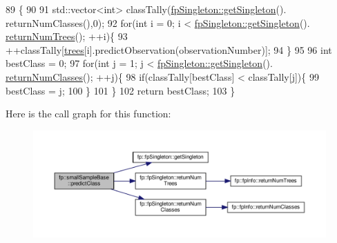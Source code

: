 \begin{DoxyCode}
89                                                    \{
90 
91                 std::vector<int> classTally(\hyperlink{classfp_1_1fpSingleton_a8bdae77b68521003e3fc630edec2e240}{fpSingleton::getSingleton}().
      returnNumClasses(),0);
92                 \textcolor{keywordflow}{for}(\textcolor{keywordtype}{int} i = 0; i < \hyperlink{classfp_1_1fpSingleton_a8bdae77b68521003e3fc630edec2e240}{fpSingleton::getSingleton}().
      \hyperlink{classfp_1_1fpSingleton_a8be36616345b6b77ce4c60b99cc2b91c}{returnNumTrees}(); ++i)\{
93                     ++classTally[\hyperlink{classfp_1_1smallSampleBase_a9a3d92948248f1809d9f025b553512b6}{trees}[i].predictObservation(observationNumber)];
94                 \}
95 
96                 \textcolor{keywordtype}{int} bestClass = 0;
97                 \textcolor{keywordflow}{for}(\textcolor{keywordtype}{int} j = 1; j < \hyperlink{classfp_1_1fpSingleton_a8bdae77b68521003e3fc630edec2e240}{fpSingleton::getSingleton}().
      \hyperlink{classfp_1_1fpSingleton_a5602580110329a6b25602b1789e4e2c2}{returnNumClasses}(); ++j)\{
98                     \textcolor{keywordflow}{if}(classTally[bestClass] < classTally[j])\{
99                         bestClass = j;
100                     \}
101                 \}
102                 \textcolor{keywordflow}{return} bestClass;
103             \}
\end{DoxyCode}
Here is the call graph for this function\+:
\nopagebreak
\begin{figure}[H]
\begin{center}
\leavevmode
\includegraphics[width=350pt]{classfp_1_1smallSampleBase_a616b7c06887cf4a1ac919bc3846a7933_cgraph}
\end{center}
\end{figure}
\mbox{\label{classfp_1_1smallSampleBase_a1e3244a9a15d53d38e6c9ca78d8d062e}} 
